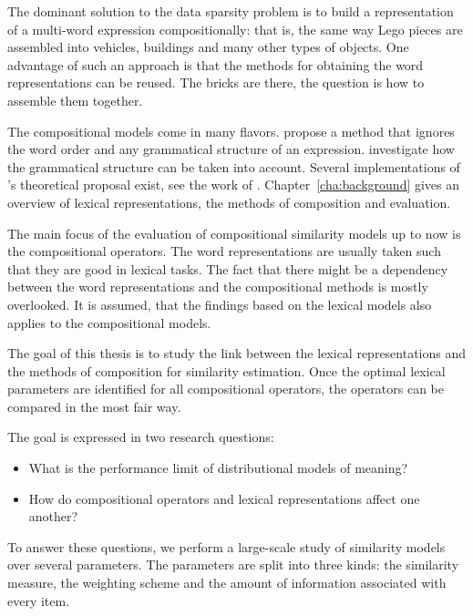 The dominant solution to the data sparsity problem is to build a representation of a multi-word expression compositionally: that is, the same way Lego pieces are assembled into vehicles, buildings and many other types of objects. One advantage of such an approach is that the methods for obtaining the word representations can be reused. The bricks are there, the question is how to assemble them together.

The compositional models come in many flavors. \citet{mitchell2010composition} propose a method that ignores the word order and any grammatical structure of an expression. \citet{DBLP:journals/corr/abs-1003-4394,baroni2014frege} investigate how the grammatical structure can be taken into account. Several implementations of \citet{DBLP:journals/corr/abs-1003-4394}'s theoretical proposal exist, see the work of \citet{Grefenstette:2011:ESC:2145432.2145580,Grefenstette:2011:ETV:2140490.2140497,kartsadrqpl2014,fried-polajnar-clark:2015:ACL-IJCNLP}. Chapter~\ref{cha:background} gives an overview of lexical representations, the methods of composition and evaluation.

The main focus of the evaluation of compositional similarity models up to now is the compositional operators. The word representations are usually taken such that they are good in lexical tasks. The fact that there might be a dependency between the word representations and the compositional methods is mostly overlooked. It is assumed, that the findings based on the lexical models also applies to the compositional models.

The goal of this thesis is to study the link between the lexical representations and the methods of composition for similarity estimation. Once the optimal lexical parameters are identified for all compositional operators, the operators can be compared in the most fair way.

The goal is expressed in two research questions:
\begin{itemize}
\item What is the performance limit of distributional models of meaning?
\item How do compositional operators and lexical representations affect one another?
\end{itemize}

To answer these questions, we perform a large-scale study of similarity models over several parameters. The parameters are split into three kinds: the similarity measure, the weighting scheme and the amount of information associated with every item.

